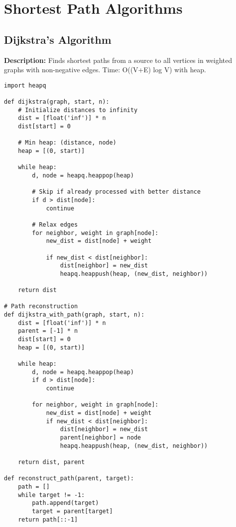 \section{Shortest Path Algorithms}

\subsection{Dijkstra's Algorithm}
\textbf{Description:} Finds shortest paths from a source to all vertices in weighted graphs with non-negative edges. Time: O((V+E) log V) with heap.

\begin{lstlisting}
import heapq

def dijkstra(graph, start, n):
    # Initialize distances to infinity
    dist = [float('inf')] * n
    dist[start] = 0
    
    # Min heap: (distance, node)
    heap = [(0, start)]
    
    while heap:
        d, node = heapq.heappop(heap)
        
        # Skip if already processed with better distance
        if d > dist[node]:
            continue
        
        # Relax edges
        for neighbor, weight in graph[node]:
            new_dist = dist[node] + weight
            
            if new_dist < dist[neighbor]:
                dist[neighbor] = new_dist
                heapq.heappush(heap, (new_dist, neighbor))
    
    return dist

# Path reconstruction
def dijkstra_with_path(graph, start, n):
    dist = [float('inf')] * n
    parent = [-1] * n
    dist[start] = 0
    heap = [(0, start)]
    
    while heap:
        d, node = heapq.heappop(heap)
        if d > dist[node]:
            continue
        
        for neighbor, weight in graph[node]:
            new_dist = dist[node] + weight
            if new_dist < dist[neighbor]:
                dist[neighbor] = new_dist
                parent[neighbor] = node
                heapq.heappush(heap, (new_dist, neighbor))
    
    return dist, parent

def reconstruct_path(parent, target):
    path = []
    while target != -1:
        path.append(target)
        target = parent[target]
    return path[::-1]
\end{lstlisting}
